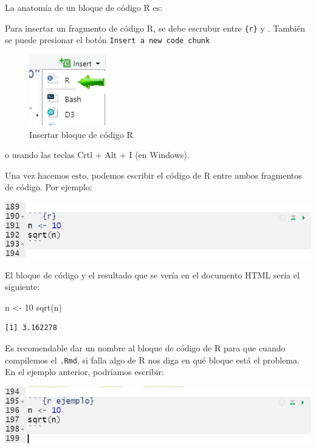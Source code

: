 \documentclass[
]{book}
\newenvironment{Shaded}{\begin{snugshade}}{\end{snugshade}}
\newcommand{\DecValTok}[1]{\textcolor[rgb]{0.00,0.00,0.81}{#1}}
\newcommand{\FunctionTok}[1]{\textcolor[rgb]{0.00,0.00,0.00}{#1}}
\newcommand{\NormalTok}[1]{#1}
\newcommand{\OtherTok}[1]{\textcolor[rgb]{0.56,0.35,0.01}{#1}}
\begin{document}
La anatomía de un bloque de código R es:

Para insertar un fragmento de código R, se debe escrubur entre \texttt{\textasciigrave{}\textasciigrave{}\textasciigrave{}\{r\}} y \texttt{\textasciigrave{}\textasciigrave{}\textasciigrave{}}. También se puede presionar el botón \texttt{Insert\ a\ new\ code\ chunk}

\begin{figure}
\centering
\includegraphics{figures/insert_chunk.png}
\caption{Insertar bloque de código R}
\end{figure}

o usando las teclas Crtl + Alt + I (en Windows).

Una vez hacemos esto, podemos escribir el código de R entre ambos fragmentos de código. Por ejemplo:

\includegraphics{figures/chunk.png}

El bloque de código y el resultado que se vería en el documento HTML sería el siguiente:

\begin{Shaded}
\begin{Highlighting}[]
\NormalTok{n }\OtherTok{\textless{}{-}} \DecValTok{10}
\FunctionTok{sqrt}\NormalTok{(n)}
\end{Highlighting}
\end{Shaded}

\begin{verbatim}
[1] 3.162278
\end{verbatim}

Es recomendable dar un nombre al bloque de código de R para que cuando compilemos el \texttt{.Rmd}, si falla algo de R nos diga en qué bloque está el problema. En el ejemplo anterior, podríamos escribir:

\includegraphics{figures/chunk_label.png}
\end{document}
